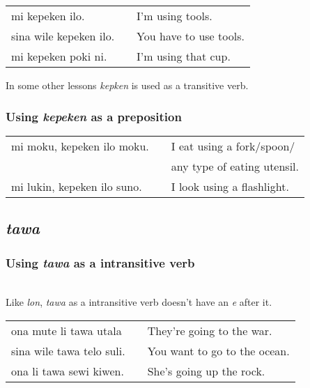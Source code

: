 \begin{supertabular}{p{5,5cm}|ll}
mi kepeken ilo. && I'm using tools. \\
sina wile kepeken ilo. && You have to use tools. \\
mi kepeken poki ni. && I'm using that cup. \\
\end{supertabular} 

In some other lessons \textit{kepken} is used as a transitive verb.
%
\subsubsection*{Using \textit{kepeken} as a preposition}
%
\begin{supertabular}{p{5,5cm}|ll}
mi moku, kepeken ilo moku. && I eat using a fork/spoon/ \\ && any type of eating utensil. \\
mi lukin, kepeken ilo suno. && I look using a flashlight.  \\
\end{supertabular} 

\subsection*{\textit{tawa}}
%
\subsubsection*{Using \textit{tawa} as a intransitive verb} \\
%
Like \textit{lon}, \textit{tawa} as a intransitive verb doesn't have an \textit{e} after it. \\

\begin{supertabular}{p{5,5cm}|ll}
ona mute li tawa utala && They're going to the war. \\
sina wile tawa telo suli. && You want to go to the ocean. \\
ona li tawa sewi kiwen. && She's going up the rock. \\
\end{supertabular} 

